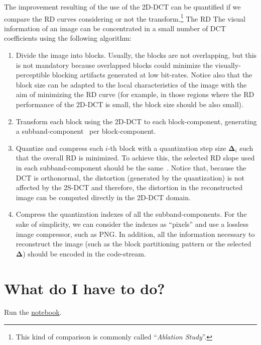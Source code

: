 The improvement resulting of the use of the 2D-DCT can be
quantified if we compare the RD curves considering or not the
transform.\footnote{This kind of comparison is commonly called
``\emph{Ablation Study}''.} The RD The visual information of an image can be
concentrated in a small number of DCT coefficients using the following
algorithm:
\begin{enumerate}
\item Divide the image into blocks. Usually, the blocks are not
  overlapping, but this is not mandatory because overlapped blocks
  could minimize the visually-perceptible blocking artifacts generated
  at low bit-rates. Notice also that the block size can be adapted to
  the local characteristics of the image with the aim of minimizing
  the RD curve (for example, in those regions where the RD performance
  of the 2D-DCT is small, the block size should be also small).
\item Transform each block using the 2D-DCT to each block-component,
  generating a subband-component~\cite{vruiz__transform_coding} per
  block-component.
\item Quantize and compress each $i$-th block with a quantization step
  size ${\mathbf\Delta}_i$ such that the overall RD is minimized. To
  achieve this, the selected RD slope used in each subband-component
  should be the same~\cite{vetterli2014foundations}. Notice that,
  because the DCT is orthonormal, the distortion (generated by the
  quantization) is not affected by the 2S-DCT and therefore, the
  distortion in the reconstructed image can be computed directly in
  the 2D-DCT domain.
\item Compress the quantization indexes of all the
  subband-components. For the sake of simplicity, we can consider the
  indexes as ``pixels'' and use a lossless image compressor, such as
  PNG. In addition, all the information necessary to reconstruct the image
  (such as the block partitioning pattern or the selected
  ${\mathbf\Delta}$) should be encoded in the code-stream.
\end{enumerate}

\section{What do I have to do?}
Run the \href{https://github.com/Sistemas-s-Multimedia.github.io/blob/master/contents/2D_DCT/RD_performance.ipynb}{notebook}.


